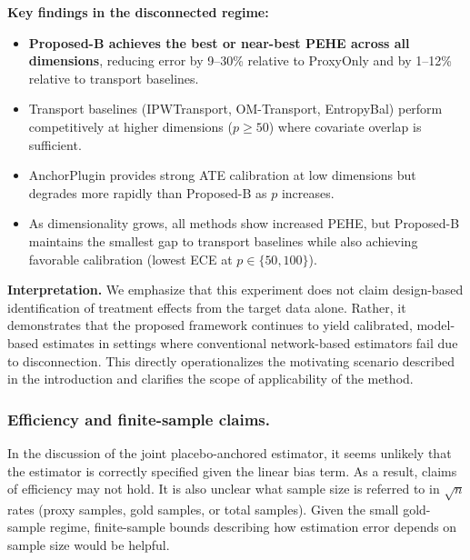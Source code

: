 {\noindent\textbf{Key findings in the disconnected regime:}
\begin{itemize}
\item \textbf{Proposed-B achieves the best or near-best PEHE across all dimensions}, reducing error by 9--30\% relative to ProxyOnly and by 1--12\% relative to transport baselines.
\item Transport baselines (IPWTransport, OM-Transport, EntropyBal) perform competitively at higher dimensions ($p \ge 50$) where covariate overlap is sufficient.
\item AnchorPlugin provides strong ATE calibration at low dimensions but degrades more rapidly than Proposed-B as $p$ increases.
\item As dimensionality grows, all methods show increased PEHE, but Proposed-B maintains the smallest gap to transport baselines while also achieving favorable calibration (lowest ECE at $p \in \{50, 100\}$).
\end{itemize}

\medskip
\noindent
\textbf{Interpretation.}
We emphasize that this experiment does not claim design-based identification of treatment effects from the target data alone. Rather, it demonstrates that the proposed framework continues to yield calibrated, model-based estimates in settings where conventional network-based estimators fail due to disconnection. This directly operationalizes the motivating scenario described in the introduction and clarifies the scope of applicability of the method.
}

\subsubsection{Efficiency and finite-sample claims.}  
In the discussion of the joint placebo-anchored estimator, it seems unlikely that the estimator is correctly specified given the linear bias term. As a result, claims of efficiency may not hold. It is also unclear what sample size is referred to in $\sqrt{n}$ rates (proxy samples, gold samples, or total samples). Given the small gold-sample regime, finite-sample bounds describing how estimation error depends on sample size would be helpful.


